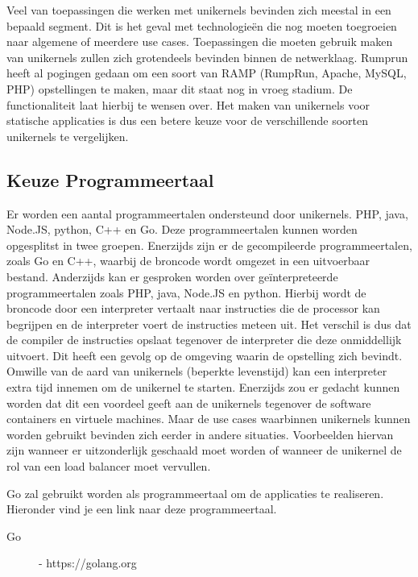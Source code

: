 Veel van toepassingen die werken met unikernels bevinden zich meestal in een bepaald segment. Dit is het geval met technologieën die nog moeten toegroeien naar algemene of meerdere use cases. Toepassingen die moeten gebruik maken van unikernels zullen zich grotendeels bevinden binnen de netwerklaag. Rumprun heeft al pogingen gedaan om een soort van RAMP (RumpRun, Apache, MySQL, PHP) opstellingen te maken, maar dit staat nog in vroeg stadium. De functionaliteit laat hierbij te wensen over. Het maken van unikernels voor statische applicaties is dus een betere keuze voor de verschillende soorten unikernels te vergelijken.

\subsection{Keuze Programmeertaal}

Er worden een aantal programmeertalen ondersteund door unikernels. PHP, java, Node.JS, python, C++ en Go. Deze programmeertalen kunnen worden opgesplitst in twee groepen. Enerzijds zijn er de gecompileerde programmeertalen, zoals Go en C++, waarbij de broncode wordt omgezet in een uitvoerbaar bestand. Anderzijds kan er gesproken worden over geïnterpreteerde programmeertalen zoals PHP, java, Node.JS en python. Hierbij wordt de broncode door een interpreter vertaalt naar instructies die de processor kan begrijpen en de interpreter voert de instructies meteen uit. Het verschil is dus dat de compiler de instructies opslaat tegenover de interpreter die deze onmiddellijk uitvoert. Dit heeft een gevolg op de omgeving waarin de opstelling zich bevindt. Omwille van de aard van unikernels (beperkte levenstijd) kan een interpreter extra tijd innemen om de unikernel te starten. Enerzijds zou er gedacht kunnen worden dat dit een voordeel geeft aan de unikernels tegenover de software containers en virtuele machines. Maar de use cases waarbinnen unikernels kunnen worden gebruikt bevinden zich eerder in andere situaties. Voorbeelden hiervan zijn wanneer er uitzonderlijk geschaald moet worden of wanneer de unikernel de rol van een load balancer moet vervullen. 

Go zal gebruikt worden als programmeertaal om de applicaties te realiseren. Hieronder vind je een link naar deze programmeertaal.

\begin{description}
\item [Go] - https://golang.org
\end{description}

